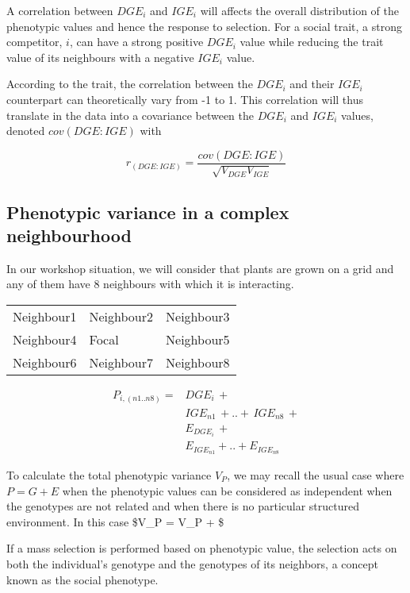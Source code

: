 \documentclass[
]{article}
\begin{document}
A correlation between \(DGE_i\) and \(IGE_i\) will affects the overall
distribution of the phenotypic values and hence the response to
selection. For a social trait, a strong competitor, \(i\), can have a
strong positive \(DGE_i\) value while reducing the trait value of its
neighbours with a negative \(IGE_i\) value.

According to the trait, the correlation between the \(DGE_i\) and their
\(IGE_i\) counterpart can theoretically vary from -1 to 1. This
correlation will thus translate in the data into a covariance between
the \(DGE_i\) and \(IGE_i\) values, denoted \(cov(DGE:IGE)\) with

\[r_{(DGE:IGE)}=\frac{cov(DGE:IGE)}{\sqrt{V_{DGE}V_{IGE}}}\]

\subsection{Phenotypic variance in a complex
neighbourhood}\label{phenotypic-variance-in-a-complex-neighbourhood}

In our workshop situation, we will consider that plants are grown on a
grid and any of them have 8 neighbours with which it is interacting.

\begin{longtable}[]{@{}lll@{}}
\toprule\noalign{}
\endhead
\bottomrule\noalign{}
\endlastfoot
Neighbour1 & Neighbour2 & Neighbour3 \\
Neighbour4 & Focal & Neighbour5 \\
Neighbour6 & Neighbour7 & Neighbour8 \\
\end{longtable}

\[ \begin{split}
P_{i, (n1..n8)} = & DGE_{i} \,+ 
                        \\ & IGE_{n1} \, +..+ \,IGE_{n8} \,+ 
                        \\& E_{DGE_{i}} \,+ 
                        \\& E_{IGE_{n1}}+..+E_{IGE_{n8}}
\end{split}\]

To calculate the total phenotypic variance \(V_P\), we may recall the
usual case where \(P=G+E\) when the phenotypic values can be considered
as independent when the genotypes are not related and when there is no
particular structured environment. In this case \$V\_P = V\_P + \$

If a mass selection is performed based on phenotypic value, the
selection acts on both the individual's genotype and the genotypes of
its neighbors, a concept known as the social phenotype.
\end{document}

